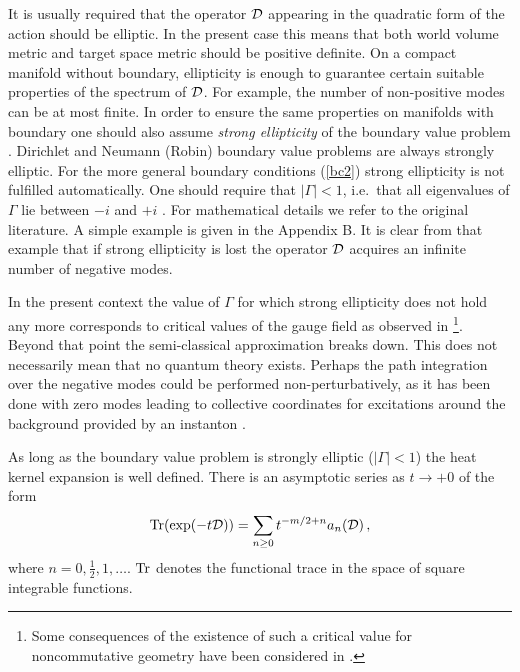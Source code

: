 \documentclass[a4paper,12pt]{article}
\begin{document}
It is usually required that the operator ${\cal D}$ appearing in the
quadratic form of the action should be elliptic. In the present case
this means that both world volume metric and target space metric
should be positive definite. On a compact manifold without 
boundary, 
ellipticity is enough to guarantee certain suitable properties of the
spectrum of ${\cal D}$. For example, the number of non-positive modes 
can be at most finite. In order to ensure
the same properties on manifolds with boundary one should also
assume {\it strong ellipticity}
of the boundary value problem \cite{Gilkey}. Dirichlet and
Neumann (Robin) boundary value problems are
always strongly elliptic. For the more general boundary conditions (\ref{bc2})
strong ellipticity is not fulfilled automatically. One should require
that $|\Gamma|<1$, i.e.\ that  all eigenvalues of $\Gamma$ lie 
between $-i$ and $+i$ \cite{AvEs,AvEs3}. For mathematical
details we refer to the original literature. A simple example is
given in the Appendix B. It is clear from that example that if
strong ellipticity is lost the operator ${\cal D}$ acquires 
 an infinite number of negative modes. 

In the present context the value of $\Gamma$ for which 
strong ellipticity does not hold any more corresponds to critical values
of the gauge field as observed in \cite{Nes}\footnote{Some 
consequences of the existence of such a critical value for 
noncommutative geometry have been considered in 
\cite{SST00,Klebanov00}.}. 
Beyond that point
the semi-classical approximation breaks down. This does not
necessarily mean that no quantum theory exists. Perhaps
the path integration over the negative modes could be performed
non-perturbatively, as it has been done with zero modes 
leading to collective coordinates for excitations around the 
background provided by an  instanton \cite{insttH,instO}.

As long as the boundary value problem is strongly elliptic
($|\Gamma|<1$) the heat kernel expansion is well defined.
There is an asymptotic
series as \( t\rightarrow +0 \) of the form 
\begin{equation}
{\textrm{Tr}}(\exp (-t{\cal D}))=
\sum _{n\geq 0}t^{-m/2+n}a_{n}({\cal D})\,,\label {asymp}
\end{equation}
 where \( n=0,\frac{1}{2},1,\dots  \).   ${\rm Tr}$ denotes the functional
trace in the space of square integrable functions.
\end{document}
